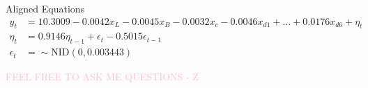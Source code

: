 Aligned Equations
$$
\begin{aligned}
y_t &= 10.3009 -0.0042x_L - 0.0045x_B - 0.0032x_c -0.0046x_{d1} + \ldots + 0.0176x_{d6} + \eta_t \\
\eta_t &= 0.9146\eta_{t-1} + \epsilon_t -0.5015\epsilon_{t-1}\\
\epsilon_t &= \sim \text{NID}(0,0.003443)
\end{aligned}
$$

{\Huge \textcolor{pink}{FEEL FREE TO ASK ME QUESTIONS - Z}}
